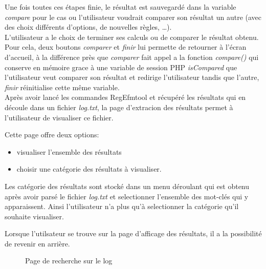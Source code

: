 Une fois toutes ces étapes finie, le résultat est sauvegardé dans la variable \emph{compare} pour le cas ou l'utilisateur voudrait comparer son résultat un autre (avec des choix différents d'options, de nouvelles règles, \dots).\\

L'utilisateur a le choix de terminer ses calculs ou de comparer le résultat obtenu. Pour cela, deux boutons \emph{comparer} et \emph{finir} lui permette de retourner à l'écran d'accueil, à la différence près que \emph{comparer} fait appel a la fonction \emph{compare()}  qui conserve en mémoire grace à une variable de session PHP \emph{isCompared} que l'utilisateur veut comparer son résultat et redirige l'utilisateur tandis que l'autre, \emph{finir} réinitialise cette m\^eme variable.\\

Après avoir lancé les commandes RegEfmtool et récupéré les résultats qui en découle dans un fichier \emph{log.txt}, la page d'extracion des résultats permet à l'utilisateur de visualiser ce fichier.


Cette page offre deux options:
\begin{itemize}
\item visualiser l'ensemble des résultats 
\item choisir une catégorie des résultats à visualiser.
\end{itemize}

Les catégorie des résultats sont stocké dans un menu déroulant qui est obtenu après avoir parsé le fichier \emph{log.txt} et selectionner l'ensemble des mot-clés qui y apparaissent. Ainsi l'utilisateur n'a plus qu'à selectionner la catégorie qu'il souhaite visualiser.


Lorsque l'utilsateur se trouve sur la page d'afficage des résultats, il a la possibilité de revenir en arrière.\\
\begin{figure}[!ht]
	\begin{center}
		\caption{Page de recherche sur le log}
  		\label{chargement1}
  	\end{center}	
\end{figure}

